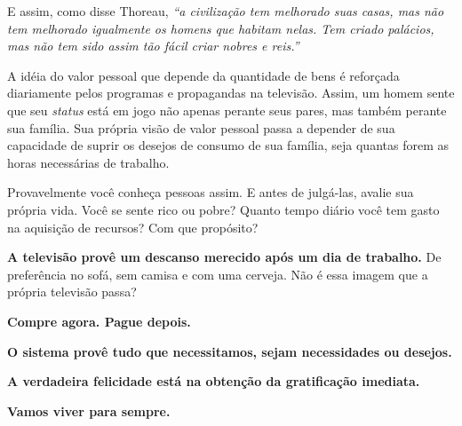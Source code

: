 E assim, como disse Thoreau, {\em``a civilização tem melhorado suas casas, mas não tem melhorado igualmente os homens que habitam nelas. Tem criado palácios, mas não tem sido assim tão fácil criar nobres e reis.''}

A idéia do valor pessoal que depende da quantidade de bens é reforçada diariamente pelos programas e propagandas na televisão. Assim, um homem sente que seu \emph{status} está em jogo não apenas perante seus pares, mas também perante sua família. Sua própria visão de valor pessoal passa a depender de sua capacidade de suprir os desejos de consumo de sua família, seja quantas forem as horas necessárias de trabalho.

Provavelmente você conheça pessoas assim. E antes de julgá-las, avalie sua própria vida. Você se sente rico ou pobre? Quanto tempo diário você tem gasto na aquisição de recursos? Com que propósito?


\textbf{A televisão provê um descanso merecido após um dia de trabalho.} De preferência no sofá, sem camisa e com uma cerveja. Não é essa imagem que a própria televisão passa?

\textbf{Compre agora. Pague depois.}

\textbf{O sistema provê tudo que necessitamos, sejam necessidades ou desejos.}

\textbf{A verdadeira felicidade está na obtenção da gratificação imediata.}

\textbf{Vamos viver para sempre.}


